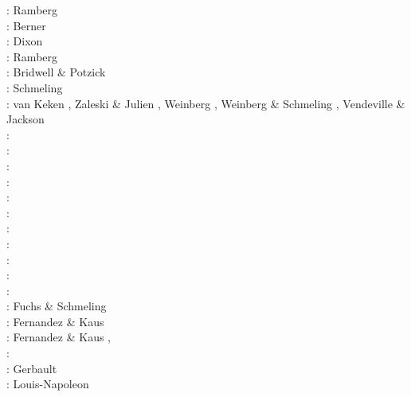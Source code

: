 \begin{scriptsize}
\nineteensixtyeight: Ramberg \cite{ramb68}\\
\nineteenseventytwo: Berner \etal \cite{bers72}\\
\nineteenseventyfive: Dixon \cite{dixo75}\\
\nineteeneighty: Ramberg \cite{ramb80}\\
\nineteeneightyone: Bridwell \& Potzick \cite{brpo81}\\
\nineteeneightyeight: Schmeling \etal \cite{sccm88}\\
\nineteenninetytwo: van Keken \etal \cite{vayv92}, Zaleski \& Julien \cite{zaju92}, 
                    Weinberg \cite{wein92}, Weinberg \& Schmeling \cite{wesc92},
                    Vendeville \& Jackson \cite{veja92}\cite{pepp92}\\
\nineteenninetythree: \cite{kesb93}\cite{nabr93}
                      \cite{potp93}\cite{povp93}
                      \cite{vasv93}\cite{pocp93}
                      \cite{popt93}\cite{wein93}
                      \cite{vayv93}\\
\nineteenninetyfour: \cite{wepo94}\\
\nineteenninetyfive: \cite{wepo95}\cite{bisc95}\cite{wepo95}\cite{crks95}\\
\nineteenninetyseven: \cite{wein97}\\
\nineteenninetynine: \cite{drdv99}\\
\twothousandone: \cite{kapo01}\cite{drvc01}\\
\twothousandthree: \cite{geur03}\cite{vavd03}\\
\twothousandfour: \cite{gepm04}\cite{istt04}\cite{geur04}\\
\twothousandseven: \cite{gebu07}\\
\twothousandeight: \cite{buge08}\cite{zlfd08}\cite{mohc98}\\
\twothousandeleven: \cite{ellw11}\cite{pege11}\\
\twothousandthirteen: Fuchs \& Schmeling \cite{fusc13}\\
\twothousandfourteen: Fernandez \& Kaus \cite{feka14b}\\
\twothousandfifteen: Fernandez \& Kaus \cite{feka15}, \cite{fuks15}\\
\twothousandsixteen: \cite{cakp16}\\
\twothousandeighteen: Gerbault \etal \cite{gesr18}\\
\twothousandtwenty: Louis-Napoleon \etal \cite{logb20}
\end{scriptsize}


